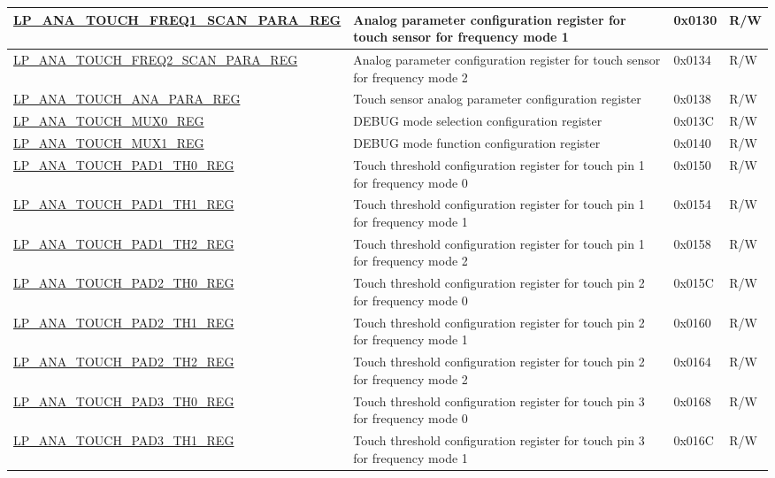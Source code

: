 \begin{longtable}{ | l | p{12cm} | p{1.3cm} | p{1.2cm} | }
\hyperref[regdesc:LPANATOUCHFREQ0SCANPARAREG]{LP\_ANA\_TOUCH\_FREQ1\_SCAN\_PARA\_REG} & Analog parameter configuration register for touch sensor for frequency mode 1 & 0x0130 & R/W \\ \hline
\hyperref[regdesc:LPANATOUCHFREQ0SCANPARAREG]{LP\_ANA\_TOUCH\_FREQ2\_SCAN\_PARA\_REG} & Analog parameter configuration register for touch sensor for frequency mode 2 & 0x0134 & R/W \\ \hline
\hyperref[regdesc:LPANATOUCHANAPARAREG]{LP\_ANA\_TOUCH\_ANA\_PARA\_REG} & Touch sensor analog parameter configuration register & 0x0138 & R/W \\ \hline
\hyperref[regdesc:LPANATOUCHMUX0REG]{LP\_ANA\_TOUCH\_MUX0\_REG} & DEBUG mode selection configuration register & 0x013C & R/W \\ \hline
\hyperref[regdesc:LPANATOUCHMUX1REG]{LP\_ANA\_TOUCH\_MUX1\_REG} & DEBUG mode function configuration register & 0x0140 & R/W \\ \hline
\hyperref[regdesc:LPANATOUCHPAD0TH0REG]{LP\_ANA\_TOUCH\_PAD1\_TH0\_REG} & Touch threshold configuration register for touch pin 1 for frequency mode 0  & 0x0150 & R/W \\ \hline
\hyperref[regdesc:LPANATOUCHPAD0TH1REG]{LP\_ANA\_TOUCH\_PAD1\_TH1\_REG} & Touch threshold configuration register for touch pin 1 for frequency mode 1  & 0x0154 & R/W \\ \hline
\hyperref[regdesc:LPANATOUCHPAD0TH2REG]{LP\_ANA\_TOUCH\_PAD1\_TH2\_REG} & Touch threshold configuration register for touch pin 1 for frequency mode 2  & 0x0158 & R/W \\ \hline
\hyperref[regdesc:LPANATOUCHPAD0TH0REG]{LP\_ANA\_TOUCH\_PAD2\_TH0\_REG} & Touch threshold configuration register for touch pin 2 for frequency mode 0 & 0x015C & R/W \\ \hline
\hyperref[regdesc:LPANATOUCHPAD0TH1REG]{LP\_ANA\_TOUCH\_PAD2\_TH1\_REG} & Touch threshold configuration register for touch pin 2 for frequency mode 1  & 0x0160 & R/W \\ \hline
\hyperref[regdesc:LPANATOUCHPAD0TH2REG]{LP\_ANA\_TOUCH\_PAD2\_TH2\_REG} & Touch threshold configuration register for touch pin 2 for frequency mode 2  & 0x0164 & R/W \\ \hline
\hyperref[regdesc:LPANATOUCHPAD0TH0REG]{LP\_ANA\_TOUCH\_PAD3\_TH0\_REG} & Touch threshold configuration register for touch pin 3 for frequency mode 0  & 0x0168 & R/W \\ \hline
\hyperref[regdesc:LPANATOUCHPAD0TH1REG]{LP\_ANA\_TOUCH\_PAD3\_TH1\_REG} & Touch threshold configuration register for touch pin 3 for frequency mode 1  & 0x016C & R/W \\ \hline

\end{longtable}
